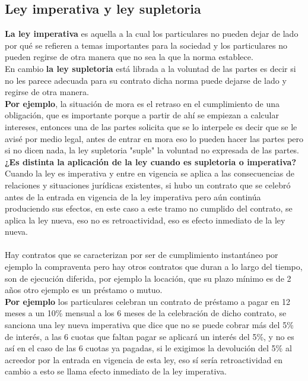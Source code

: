 \documentclass[12pt]{book}
\begin{document}
\subsection{Ley imperativa y ley supletoria}

\textbf{La ley imperativa} es aquella a la cual los particulares no pueden dejar de lado por qué se refieren a temas importantes para la sociedad y los particulares no pueden regirse de otra manera que no sea la que la norma establece.
\\
En cambio \textbf{la ley supletoria} está librada a la voluntad de las partes es decir si no les parece adecuada para su contrato dicha norma puede dejarse de lado y regirse de otra manera.
\\
\textbf{Por ejemplo}, la situación de mora es el retraso en el cumplimiento de una obligación, que es importante porque a partir de ahí se empiezan a calcular intereses, entonces una de las partes solicita que se lo interpele es decir que se le avisé por medio legal, antes de entrar en mora eso lo pueden hacer las partes pero si no dicen nada, la ley supletoria "suple" la voluntad no expresada de las partes.
\\
\textbf{¿Es distinta la aplicación de la ley cuando es supletoria o imperativa?}
Cuando la ley es imperativa y entre en vigencia se aplica a las consecuencias de relaciones y situaciones jurídicas existentes, si hubo un contrato que se celebró antes de la entrada en vigencia de la ley imperativa pero aún continúa produciendo sus efectos, en este caso a este tramo no cumplido del contrato, se aplica la ley nueva, eso no es retroactividad, eso es efecto inmediato de la ley nueva.
\\  \\
Hay contratos que se caracterizan por ser de cumplimiento instantáneo por ejemplo la compraventa pero hay otros contratos que duran a lo largo del tiempo, son de ejecución diferida, por ejemplo la locación, que su plazo mínimo es de 2 años otro ejemplo es un préstamo o mutuo.
\\
\textbf{Por ejemplo} los particulares celebran un contrato de préstamo a pagar en 12 meses a un 10\% mensual a los 6 meses de la celebración de dicho contrato, se sanciona una ley nueva imperativa que dice que no se puede cobrar más del 5\% de interés, a las 6 cuotas que faltan pagar se aplicará un interés del 5\%, y no es así en el caso de las 6 cuotas ya pagadas, si le exigimos la devolución del 5\% al acreedor por la entrada en vigencia de esta ley, eso sí sería retroactividad en cambio a esto se llama efecto inmediato de la ley imperativa.
\end{document}
